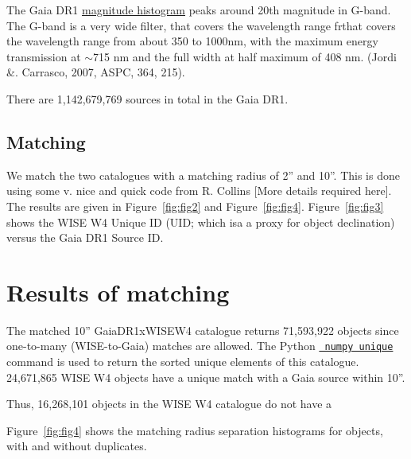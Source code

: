 \documentclass[usenatbib]{mn2e}
\begin{document}
    The Gaia DR1
    \href{https://www.cosmos.esa.int/documents/29201/1125416/magnitude+histogram+placeholder.png/}
    {magnitude histogram} peaks around 20th magnitude in G-band. The
    G-band is a very wide filter, that covers the wavelength range frthat
    covers the wavelength range from about 350 to 1000nm, with the maximum
    energy transmission at $\sim$715 nm and the full width at half maximum
    of 408 nm.  (Jordi \&. Carrasco, 2007, ASPC, 364, 215).
    
    There are 1,142,679,769 sources in total in the Gaia DR1. 



    \subsection{Matching}
    We match the two catalogues with a matching radius of 2'' and 10''. 
    This is done using some v. nice and quick code from R. Collins [More details required here]. 
    The results are given in Figure~\ref{fig:fig2} and Figure~\ref{fig:fig4}. 
    Figure~\ref{fig:fig3} shows the WISE W4 Unique ID (UID; which isa a proxy for object declination) 
    versus the Gaia DR1 Source ID. 


\section{Results of matching}
The matched 10'' GaiaDR1xWISEW4 catalogue returns 71,593,922 objects
since one-to-many (WISE-to-Gaia) matches are allowed. The Python
\href{https://docs.scipy.org/doc/numpy/reference/generated/numpy.unique.html}{{\tt
numpy unique}} command is used to return the sorted unique elements of
this catalogue. 24,671,865 WISE W4 objects have a unique match with a
Gaia source within 10''. 

Thus, 16,268,101 objects in the WISE W4 catalogue do not have a

Figure~\ref{fig:fig4} shows the matching radius separation histograms for objects, 
with and without duplicates. 
\end{document}
